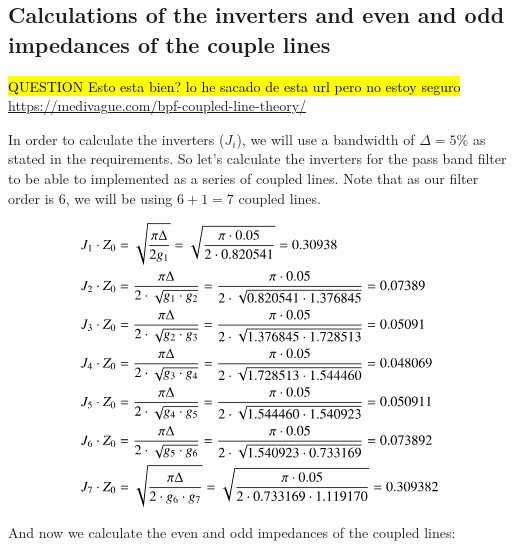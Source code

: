 \documentclass[12pt]{report} %
\newcommand{\question}[1]{\sethlcolor{red}\hl{QUESTION #1}}
\begin{document}
\subsection{Calculations of the inverters and even and odd impedances of the couple lines}

\question{Esto esta bien? lo he sacado de esta url pero no estoy seguro}
\url{https://medivague.com/bpf-coupled-line-theory/}

In order to calculate the inverters ($J_i$), we will use a bandwidth of $\Delta = 5\%$ as stated in the requirements. So let's calculate the inverters for the pass band filter to be able to implemented as a series of coupled lines. Note that as our filter order is 6, we will be using $6 + 1 = 7$ coupled lines.

\begin{align*}
J_1 \cdot Z_0 &= \sqrt{\frac{\pi \* \Delta}{2 \* g_1}} = \sqrt{\frac{\pi \cdot 0.05}{2 \cdot 0.820541}} = 0.30938 \\
J_2 \cdot Z_0 &= \frac{\pi \* \Delta}{2 \cdot \sqrt{g_1 \cdot g_2}} = \frac{\pi \cdot 0.05}{2 \cdot \sqrt{0.820541 \cdot 1.376845}} = 0.07389 \\
J_3 \cdot Z_0 &= \frac{\pi \* \Delta}{2 \cdot \sqrt{g_2 \cdot g_3}} = \frac{\pi \cdot 0.05}{2 \cdot \sqrt{1.376845 \cdot 1.728513}} = 0.05091 \\
J_4 \cdot Z_0 &= \frac{\pi \* \Delta}{2 \cdot \sqrt{g_3 \cdot g_4}} = \frac{\pi \cdot 0.05}{2 \cdot \sqrt{1.728513 \cdot 1.544460}} = 0.048069 \\
J_5 \cdot Z_0 &= \frac{\pi \* \Delta}{2 \cdot \sqrt{g_4 \cdot g_5}} = \frac{\pi \cdot 0.05}{2 \cdot \sqrt{1.544460 \cdot 1.540923}} = 0.050911 \\
J_6 \cdot Z_0 &= \frac{\pi \* \Delta}{2 \cdot \sqrt{g_5 \cdot g_6}} = \frac{\pi \cdot 0.05}{2 \cdot \sqrt{1.540923 \cdot 0.733169}} = 0.073892 \\
J_7 \cdot Z_0 &= \sqrt{\frac{\pi \* \Delta}{2 \cdot g_6 \cdot g_7}} = \sqrt{\frac{\pi \cdot 0.05}{2 \cdot 0.733169 \cdot 1.119170}} = 0.309382 \\
\end{align*}

And now we calculate the even and odd impedances of the coupled lines:
\end{document}
